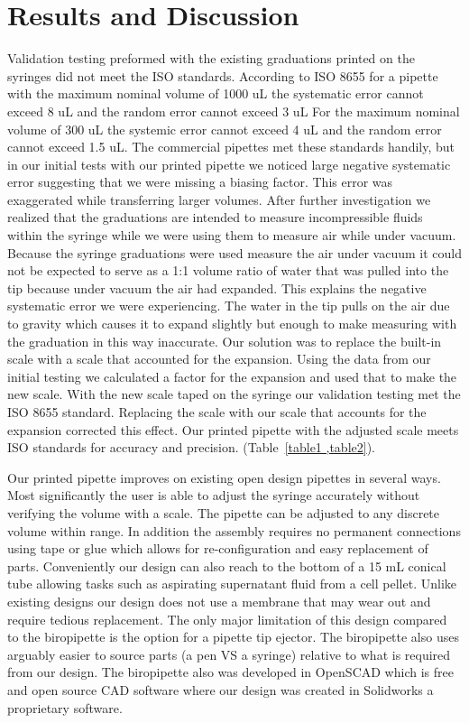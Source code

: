 \documentclass[10pt,letterpaper]{article}
\begin{document}
\section*{Results and Discussion}
Validation testing preformed with the existing graduations printed on the syringes did not meet the ISO standards.
According to ISO 8655 for a pipette with the maximum nominal volume of 1000 uL the systematic error cannot exceed 8 uL and the random error cannot exceed 3 uL
For the maximum nominal volume of 300 uL the systemic error cannot exceed 4 uL and the random error cannot exceed 1.5 uL.
The commercial pipettes met these standards handily, but in our initial tests with our printed pipette we noticed large negative systematic error suggesting that we were missing a biasing factor. 
This error was exaggerated while transferring larger volumes.
After further investigation we realized that the graduations are intended to measure incompressible fluids within the syringe while we were using them to measure air while under vacuum.
Because the syringe graduations were used measure the air under vacuum it could not be expected to serve as a 1:1 volume ratio of water that was pulled into the tip because under vacuum the air had expanded.
This explains the negative systematic error we were experiencing.
The water in the tip pulls on the air due to gravity which causes it to expand slightly but enough to make measuring with the graduation in this way inaccurate.
Our solution was to replace the built-in scale with a scale that accounted for the expansion.
Using the data from our initial testing we calculated a factor for the expansion and used that to make the new scale.
With the new scale taped on the syringe our validation testing met the ISO 8655 standard.
Replacing the scale with our scale that accounts for the expansion corrected this effect. 
Our printed pipette with the adjusted scale meets ISO standards for accuracy and precision. (Table~\ref{table1 ,table2}).

Our printed pipette improves on existing open design pipettes in several ways. 
Most significantly the user is able to adjust the syringe accurately without verifying the volume with a scale.
The pipette can be adjusted to any discrete volume within range.
In addition the assembly requires no permanent connections using tape or glue which allows for re-configuration and easy replacement of parts.
Conveniently our design can also reach to the bottom of a 15 mL conical tube allowing tasks such as aspirating supernatant fluid from a cell pellet.
Unlike existing designs our design does not use a membrane that may wear out and require tedious replacement.
The only major limitation of this design compared to the biropipette is the option for a pipette tip ejector.
The biropipette also uses arguably easier to source parts (a pen VS a syringe) relative to what is required from our design.
The biropipette also was developed in OpenSCAD which is free and open source CAD software where our design was created in Solidworks a proprietary software. 
\end{document}
